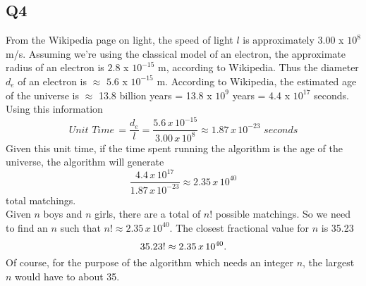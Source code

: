 \documentclass[12pt, oneside]{article}
\begin{document}
\subsection*{Q4}
From the Wikipedia page on light, the speed of light $l$ is approximately $3.00$ x $10^8$ m/s. Assuming we're using the classical model of an electron, the approximate radius of an electron is $2.8$ x $10^{-15}$ m, according to Wikipedia. Thus the diameter $d_e$ of an electron is $\approx$ $5.6$ x $10^{-15}$ m. According to Wikipedia, the estimated age of the universe is $\approx$ 13.8 billion years = 13.8 x $10^9$ years = 4.4 x $10^{17}$ seconds. Using this information
\[Unit\,\,Time\, = \frac{d_e}{l} = \frac{5.6\,x\,10^{-15}}{3.00\,x\,10^8} \approx 1.87\,x\,10^{-23}\,\,seconds \]  
Given this unit time, if the time spent running the algorithm is the age of the universe, the algorithm will generate 
\[\frac{4.4\,x\,10^{17} }{1.87\,x\,10^{-23}} \approx 2.35\,x\,10^{40} \]
total matchings.\\
Given  $n$ boys and $n$ girls, there are a total of $n!$ possible matchings. So we need to find an $n$ such that $n! \approx 2.35\,x\,10^{40}$. The closest fractional value for $n$ is 35.23
\[35.23! \approx 2.35\,x\,10^{40} \ldotp \]
Of course, for the purpose of the algorithm which needs an integer $n$, the largest $n$ would have to about 35.
\end{document}
